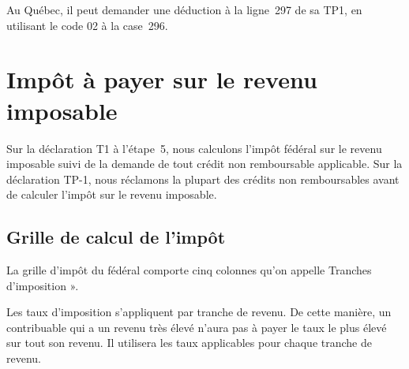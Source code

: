 Au Québec, il peut demander une déduction à la ligne~297 de sa TP1, en utilisant le code 02 à la case~296.



\section{Impôt à payer sur le revenu imposable}
\begin{intro}
	Sur la déclaration T1 à l'étape~5, nous calculons l'impôt fédéral sur le revenu imposable suivi de la demande de tout crédit non remboursable applicable. Sur la déclaration TP-1, nous réclamons la plupart des crédits non remboursables avant de calculer l'impôt sur le revenu imposable. 
\end{intro}


\subsection{Grille de calcul de l'impôt}
La grille d'impôt du fédéral comporte cinq colonnes qu'on appelle \og Tranches d'imposition ».

\begin{note}
	Les taux d'imposition s'appliquent par tranche de revenu. De cette manière, un contribuable qui a un revenu très élevé n'aura pas à payer le taux le plus élevé sur tout son revenu. Il utilisera les taux applicables pour chaque tranche de revenu.
\end{note}



